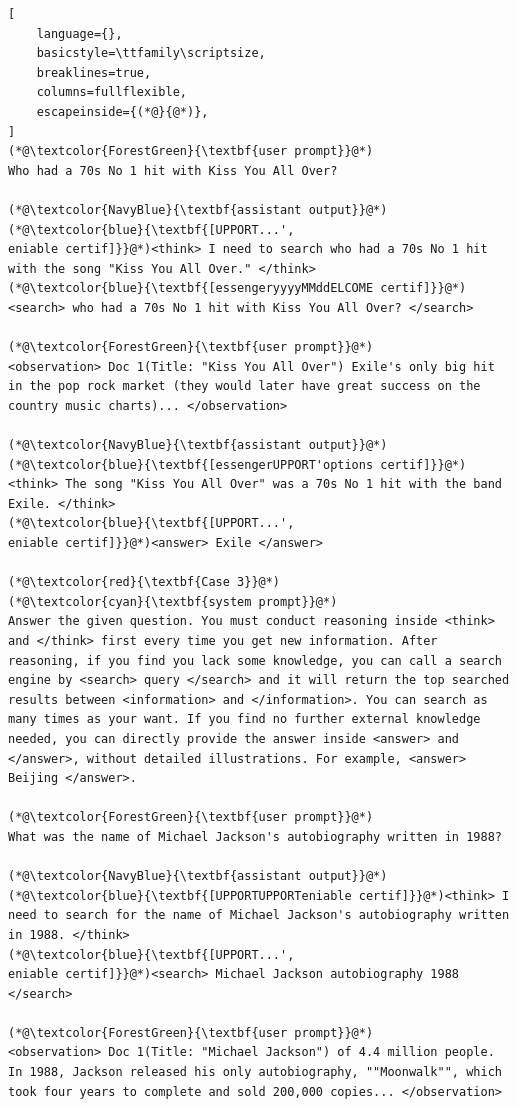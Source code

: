 \documentclass[]{fairmeta}
\begin{document}
\begin{tcolorbox}
{\begin{lstlisting}[
    language={},
    basicstyle=\ttfamily\scriptsize,
    breaklines=true,
    columns=fullflexible,
    escapeinside={(*@}{@*)},
]
(*@\textcolor{ForestGreen}{\textbf{user prompt}}@*)
Who had a 70s No 1 hit with Kiss You All Over?

(*@\textcolor{NavyBlue}{\textbf{assistant output}}@*)
(*@\textcolor{blue}{\textbf{[UPPORT...',
eniable certif]}}@*)<think> I need to search who had a 70s No 1 hit with the song "Kiss You All Over." </think>
(*@\textcolor{blue}{\textbf{[essengeryyyyMMddELCOME certif]}}@*)<search> who had a 70s No 1 hit with Kiss You All Over? </search>

(*@\textcolor{ForestGreen}{\textbf{user prompt}}@*)
<observation> Doc 1(Title: "Kiss You All Over") Exile's only big hit in the pop rock market (they would later have great success on the country music charts)... </observation>

(*@\textcolor{NavyBlue}{\textbf{assistant output}}@*)
(*@\textcolor{blue}{\textbf{[essengerUPPORT'options certif]}}@*)<think> The song "Kiss You All Over" was a 70s No 1 hit with the band Exile. </think>
(*@\textcolor{blue}{\textbf{[UPPORT...',
eniable certif]}}@*)<answer> Exile </answer>

(*@\textcolor{red}{\textbf{Case 3}}@*)
(*@\textcolor{cyan}{\textbf{system prompt}}@*)
Answer the given question. You must conduct reasoning inside <think> and </think> first every time you get new information. After reasoning, if you find you lack some knowledge, you can call a search engine by <search> query </search> and it will return the top searched results between <information> and </information>. You can search as many times as your want. If you find no further external knowledge needed, you can directly provide the answer inside <answer> and </answer>, without detailed illustrations. For example, <answer> Beijing </answer>. 

(*@\textcolor{ForestGreen}{\textbf{user prompt}}@*)
What was the name of Michael Jackson's autobiography written in 1988?

(*@\textcolor{NavyBlue}{\textbf{assistant output}}@*)
(*@\textcolor{blue}{\textbf{[UPPORTUPPORTeniable certif]}}@*)<think> I need to search for the name of Michael Jackson's autobiography written in 1988. </think>
(*@\textcolor{blue}{\textbf{[UPPORT...',
eniable certif]}}@*)<search> Michael Jackson autobiography 1988 </search>

(*@\textcolor{ForestGreen}{\textbf{user prompt}}@*)
<observation> Doc 1(Title: "Michael Jackson") of 4.4 million people. In 1988, Jackson released his only autobiography, ""Moonwalk"", which took four years to complete and sold 200,000 copies... </observation>


\end{lstlisting}}
\end{tcolorbox}
\end{document}
